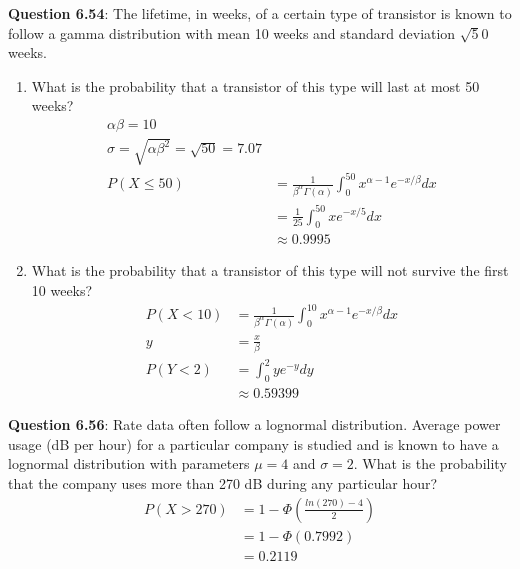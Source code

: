 \documentclass{article}
\begin{document}
    \noindent\textbf{Question 6.54}: The lifetime, in weeks, of a certain type of 
    transistor is known to follow a gamma distribution with mean 10 weeks and standard 
    deviation $\sqrt50$ weeks.
        \begin{enumerate}[label = (\alph*) ]
            \item What is the probability that a transistor of this type will last at 
            most 50 weeks?
                \begin{align*}
                    \alpha\beta = 10\\
                    \sigma = \sqrt{\alpha\beta^2} = \sqrt{50} = 7.07\\
                    P(X\leq 50) &= \frac{1}{\beta^\alpha\Gamma(\alpha)}\int_0^{50}x^{\alpha-1}e^{-x/\beta}dx\\
                                &= \frac{1}{25}\int_0^{50} xe^{-x/5}dx\\
                                &\approx 0.9995
                \end{align*}
            \item  What is the probability that a transistor of this type will not 
            survive the first 10 weeks?
                \begin{align*}
                    P(X<10) &= \frac{1}{\beta^\alpha\Gamma(\alpha)}\int_0^{10}x^{\alpha - 1}e^{-x/\beta}dx \\
                    y &= \frac{x}{\beta}\\
                    P(Y < 2) &= \int_0^2ye^{-y}dy\\
                    &\approx 0.59399
                \end{align*}
        \end{enumerate}
    
    \noindent\textbf{Question 6.56}: Rate data often follow a lognormal distribution.
    Average power usage (dB per hour) for a particular company is studied and is known 
    to have a lognormal distribution with parameters $\mu = 4$ and $\sigma = 2$. What
    is the probability that the company uses more than 270 dB during any particular hour?
        \begin{align*}
            P(X > 270) &= 1 - \Phi(\frac{ln(270)-4}{2})\\
            &= 1 - \Phi(0.7992)\\
            &= 0.2119
        \end{align*}
    
\end{document}
